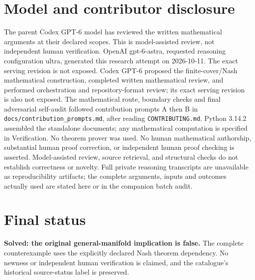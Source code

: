 \documentclass[11pt]{article}
\begin{document}
\section{Model and contributor disclosure}
The parent Codex GPT-6 model has reviewed the written mathematical arguments at their declared scopes. This is model-assisted review, not independent human verification.
OpenAI gpt-6-astra, requested reasoning configuration ultra, generated this research
attempt on 2026-10-11. The exact serving revision is not exposed. Codex GPT-6
proposed the finite-cover/Nash mathematical construction, completed written mathematical review, and performed orchestration and repository-format review; its exact serving revision
is also not exposed. The mathematical route, boundary checks and final adversarial
self-audit followed contribution prompts A then B in
\texttt{docs/contribution\_prompts.md}, after reading \texttt{CONTRIBUTING.md}.
Python 3.14.2 assembled the standalone documents; any mathematical computation is
specified in Verification. No theorem prover was used. No human mathematical
authorship, substantial human proof correction, or independent human proof checking
is asserted. Model-assisted review, source retrieval, and structural checks do not
establish correctness or novelty. Full private reasoning transcripts are unavailable
as reproducibility artifacts; the complete arguments, inputs and outcomes actually
used are stated here or in the companion batch audit.
\section{Final status}
\textbf{Solved: the original general-manifold implication is false.}
The complete counterexample uses the explicitly declared Nash theorem dependency.
No newness or independent human verification is claimed, and the catalogue's
historical source-status label is preserved.
\end{document}
